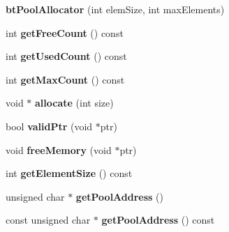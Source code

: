 \begin{DoxyCompactItemize}
\item 
\hypertarget{classbt_pool_allocator_a00877988f8da0e869dadbed143bd7ee7}{{\bfseries bt\+Pool\+Allocator} (int elem\+Size, int max\+Elements)}\label{classbt_pool_allocator_a00877988f8da0e869dadbed143bd7ee7}

\item 
\hypertarget{classbt_pool_allocator_a7b82642282c3bcabecaf40f30d97770a}{int {\bfseries get\+Free\+Count} () const }\label{classbt_pool_allocator_a7b82642282c3bcabecaf40f30d97770a}

\item 
\hypertarget{classbt_pool_allocator_a50cdf800f71359b37eee17c846386daa}{int {\bfseries get\+Used\+Count} () const }\label{classbt_pool_allocator_a50cdf800f71359b37eee17c846386daa}

\item 
\hypertarget{classbt_pool_allocator_a75a9b281c130cace04f60123d67a57fd}{int {\bfseries get\+Max\+Count} () const }\label{classbt_pool_allocator_a75a9b281c130cace04f60123d67a57fd}

\item 
\hypertarget{classbt_pool_allocator_ae2d7e02c7ba5f6d713d9e8aa740095ca}{void $\ast$ {\bfseries allocate} (int size)}\label{classbt_pool_allocator_ae2d7e02c7ba5f6d713d9e8aa740095ca}

\item 
\hypertarget{classbt_pool_allocator_a56dc7a155cfd52bffc5efe933261b6c6}{bool {\bfseries valid\+Ptr} (void $\ast$ptr)}\label{classbt_pool_allocator_a56dc7a155cfd52bffc5efe933261b6c6}

\item 
\hypertarget{classbt_pool_allocator_a26bf2c983bc378c3da96ee218861b65f}{void {\bfseries free\+Memory} (void $\ast$ptr)}\label{classbt_pool_allocator_a26bf2c983bc378c3da96ee218861b65f}

\item 
\hypertarget{classbt_pool_allocator_a2bdce19b1ffb5f6fb5cd597dc3f00a3e}{int {\bfseries get\+Element\+Size} () const }\label{classbt_pool_allocator_a2bdce19b1ffb5f6fb5cd597dc3f00a3e}

\item 
\hypertarget{classbt_pool_allocator_a80d1a161e54fd676d7a4da5f98bd3686}{unsigned char $\ast$ {\bfseries get\+Pool\+Address} ()}\label{classbt_pool_allocator_a80d1a161e54fd676d7a4da5f98bd3686}

\item 
\hypertarget{classbt_pool_allocator_ad3a56827ea85076403d2c43e5047a55c}{const unsigned char $\ast$ {\bfseries get\+Pool\+Address} () const }\label{classbt_pool_allocator_ad3a56827ea85076403d2c43e5047a55c}

\end{DoxyCompactItemize}


